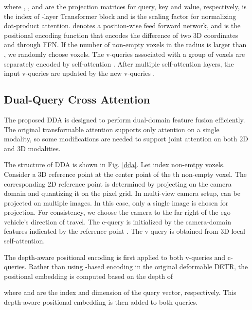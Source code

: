 \documentclass[lettersize,journal]{IEEEtran}
\begin{document}
where , , and  are the projection matrices for query, key and value, respectively,  is the index of -layer Transformer block and  is the scaling factor for normalizing dot-product attention.  denotes a position-wise feed forward network, and  is the positional encoding function that encodes the difference of two 3D coordinates   and  through FFN. 
 If the number of non-empty voxels in the radius is larger than , we randomly choose  voxels. The v-queries associated with a group of  voxels are separately encoded by self-attention \cite{transformer}. 
After multiple self-attention layers, the input v-queries  are updated by the new v-queries .





\subsection{Dual-Query Cross Attention}
The proposed DDA is designed to perform dual-domain feature fusion efficiently. The original transformable attention \cite{def-detr} supports only attention on a single modality, so some modifications are needed to support joint attention on both 2D and 3D modalities. 

The structure of DDA is shown in Fig. \ref{dda}. Let  index  non-emtpy voxels. Consider a 3D reference point  at the center point of the th non-empty voxel. The corresponding 2D reference point   is determined by projecting  on the camera domain and quantizing it on the pixel grid. In multi-view camera setup,  can be projected on multiple images. In this case, only a single image is chosen for projection. For consistency, we choose the camera to the far right of the ego vehicle's direction of travel.
The c-query  is initialized by the camera-domain features  indicated by the reference point . The v-query  is obtained from 3D local self-attention. 

The depth-aware positional encoding is first applied to both v-queries and c-queries. Rather than using -based encoding in the original deformable DETR, the positional embedding is computed based on the depth  of  

where   and  are the index and dimension of the query vector, respectively. This depth-aware positional embedding is then added to both queries. 
\end{document}

